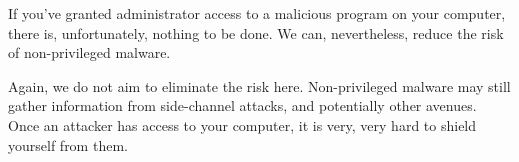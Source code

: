 If you've granted administrator access to a malicious program on your computer, there is, unfortunately, nothing to be done. We can, nevertheless, reduce the risk of non-privileged malware. 


Again, we do not aim to eliminate the risk here. Non-privileged malware may still gather information from side-channel attacks, and potentially other avenues. Once an attacker has access to your computer, it is very, very hard to shield yourself from them.